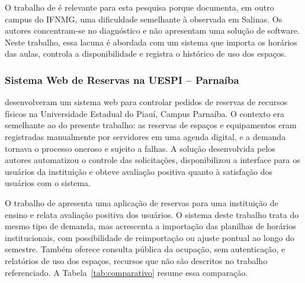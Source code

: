 \documentclass[
	12pt,				%
	twoside,			%
	openany,			%
	a4paper,			%
	chapter=TITLE,		%
	section=TITLE,		%
	subsection=TITLE,	%
	subsubsection=TITLE,%
	english,			%
	french,				%
	spanish,			%
	brazil,				%
	]{abntex2}
\begin{document}
O trabalho de  é relevante para esta pesquisa porque documenta, em outro campus do IFNMG, uma dificuldade semelhante à observada em Salinas. Os autores concentram-se no diagnóstico e não apresentam uma solução de software. Neste trabalho, essa lacuna é abordada com um sistema que importa os horários das aulas, controla a disponibilidade e registra o histórico de uso dos espaços.

\subsubsection{Sistema Web de Reservas na UESPI -- Parnaíba}
\label{sec:relcaio2}

 desenvolveram um sistema web para controlar pedidos de reservas de recursos físicos na Universidade Estadual do Piauí, Campus Parnaíba. O contexto era semelhante ao do presente trabalho: as reservas de espaços e equipamentos eram registradas manualmente por servidores em uma agenda digital, e a demanda tornava o processo oneroso e sujeito a falhas. A solução desenvolvida pelos autores automatizou o controle das solicitações, disponibilizou a interface para os usuários da instituição e obteve avaliação positiva quanto à satisfação dos usuários com o sistema.

O trabalho de  apresenta uma aplicação de reservas para uma instituição de ensino e relata avaliação positiva dos usuários. O sistema deste trabalho trata do mesmo tipo de demanda, mas acrescenta a importação das planilhas de horários institucionais, com possibilidade de reimportação ou ajuste pontual ao longo do semestre. Também oferece consulta pública da ocupação, sem autenticação, e relatórios de uso dos espaços, recursos que não são descritos no trabalho referenciado. A Tabela~\ref{tab:comparativo} resume essa comparação.
\end{document}

